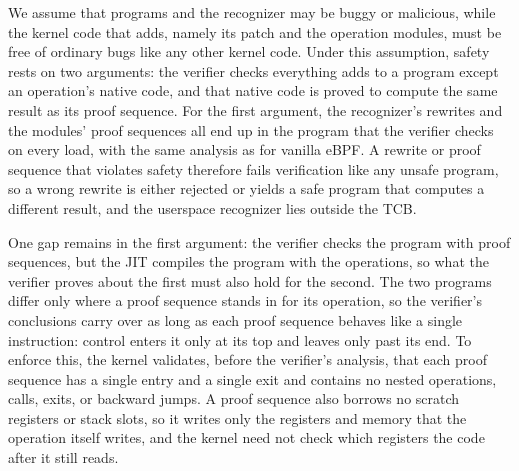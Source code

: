 We assume that programs and the recognizer may be buggy or malicious, while the kernel code that \tool adds, namely its patch and the operation modules, must be free of ordinary bugs like any other kernel code.
Under this assumption, safety rests on two arguments: the verifier checks everything \tool adds to a program except an operation's native code, and that native code is proved to compute the same result as its proof sequence.
For the first argument, the recognizer's rewrites and the modules' proof sequences all end up in the program that the verifier checks on every load, with the same analysis as for vanilla eBPF.
A rewrite or proof sequence that violates safety therefore fails verification like any unsafe program, so a wrong rewrite is either rejected or yields a safe program that computes a different result, and the userspace recognizer lies outside the TCB.

One gap remains in the first argument: the verifier checks the program with proof sequences, but the JIT compiles the program with the operations, so what the verifier proves about the first must also hold for the second.
The two programs differ only where a proof sequence stands in for its operation, so the verifier's conclusions carry over as long as each proof sequence behaves like a single instruction: control enters it only at its top and leaves only past its end.
To enforce this, the kernel validates, before the verifier's analysis, that each proof sequence has a single entry and a single exit and contains no nested operations, calls, exits, or backward jumps.
A proof sequence also borrows no scratch registers or stack slots, so it writes only the registers and memory that the operation itself writes, and the kernel need not check which registers the code after it still reads.

